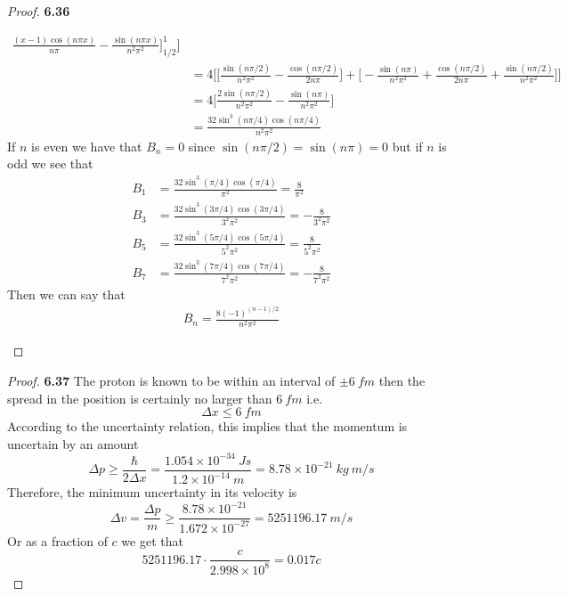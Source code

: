 \documentclass[11pt]{article}
\theoremstyle{definition}
\begin{document}
\begin{proof}{\textbf{6.36}}
\begin{itemize}
\begin{align*}
                \frac{(x-1)\cos(n\pi x)}{n\pi}
                -\frac{\sin(n\pi x)}{n^2\pi^2}
            \Bigg]_{1/2}^1
        \Bigg]\\
        &= 4\Bigg[
            \Bigg[
                \frac{\sin(n\pi/2)}{n^2\pi^2}
                - \frac{\cos(n\pi/2)}{2n\pi}
            \Bigg]
            + \Bigg[
                - \frac{\sin(n\pi)}{n^2\pi^2}
                + \frac{\cos(n\pi/2)}{2n\pi}
                + \frac{\sin(n\pi/2)}{n^2\pi^2}
            \Bigg]
        \Bigg]\\
        &= 4\Bigg[
            \frac{2\sin(n\pi/2)}{n^2\pi^2} - \frac{\sin(n\pi)}{n^2\pi^2}
        \Bigg]\\
        &= \frac{32\sin^3(n\pi/4)\cos(n\pi/4)}{n^2\pi^2}
    \end{align*}
    If $n$ is even we have that $B_n = 0$ since $\sin(n\pi/2) = \sin(n\pi) = 0$
    but if $n$ is odd we see that
    \begin{align*}
        B_1 &= \frac{32\sin^3(\pi/4)\cos(\pi/4)}{\pi^2} = \frac{8}{\pi^2}\\
        B_3 &= \frac{32\sin^3(3\pi/4)\cos(3\pi/4)}{3^2\pi^2} = -\frac{8}{3^2\pi^2}\\
        B_5 &= \frac{32\sin^3(5\pi/4)\cos(5\pi/4)}{5^2\pi^2} = \frac{8}{5^2\pi^2}\\
        B_7 &= \frac{32\sin^3(7\pi/4)\cos(7\pi/4)}{7^2\pi^2} = -\frac{8}{7^2\pi^2}
    \end{align*}
    Then we can say that
    \begin{align*}
        B_n = \frac{8(-1)^{(n-1)/2}}{n^2\pi^2}
    \end{align*}
\end{itemize}
\end{proof}
\begin{proof}{\textbf{6.37}}
    The proton is known to be within an interval of $\pm 6~fm$ then the spread
    in the position is certainly no larger than $6~fm$ i.e.
    $$\Delta x \leq 6~fm$$
    According to the uncertainty relation, this implies that the momentum is
    uncertain by an amount
    $$\Delta p \geq \frac{\hbar}{2\Delta x}
    = \frac{1.054 \times 10^{-34}~Js}{1.2\times 10^{-14}~m}
    = 8.78\times 10^{-21}~kg~m/s$$
    Therefore, the minimum uncertainty in its velocity is
    $$\Delta v = \frac{\Delta p}{m}
    \geq \frac{8.78\times 10^{-21}}{1.672\times 10^{-27}}
    = 5251196.17~m/s$$
    Or as a fraction of $c$ we get that
    $$5251196.17\cdot \frac{c}{2.998\times 10^8} = 0.017c$$
\end{proof}
\end{document}
